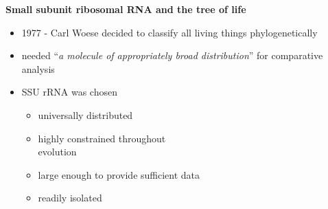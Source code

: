 \documentclass[landscape]{slides}
\begin{document}
\begin{slide}
\begin{center}
\large
\textbf{Small subunit ribosomal RNA and the tree of life}
\end{center}
\medskip
\begin{minipage}{5.2in}
\small
\begin{itemize}
\item
1977 - Carl Woese decided to classify all living things phylogenetically
\item
needed ``\emph{a molecule of appropriately broad distribution}'' for
comparative analysis
\item
SSU rRNA was chosen
\begin{itemize}
  \item
    universally distributed
  \item
    highly constrained throughout \\ evolution
  \item
    large enough to provide sufficient data%
  \item
    readily isolated
\end{itemize}
\end{itemize}


\end{minipage}
\end{slide}
\end{document}

